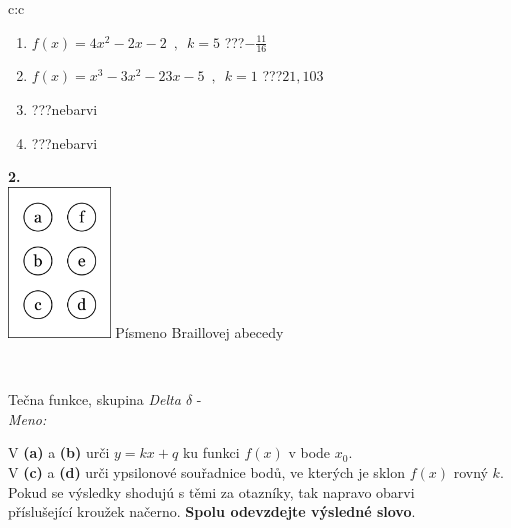 \documentclass[10pt]{report}
\begin{document}
\begin{tabular}{c:c}
\begin{minipage}[c][104.5mm][t]{0.5\linewidth}
\begin{center}
\begin{minipage}{0.79\linewidth}
\begin{center}
\begin{varwidth}{\linewidth}
\begin{enumerate}
\item $f(x)=4x^2-2x-2\enspace , \enspace k=5$\quad \dotfill\; ???\;\dotfill \quad $-\frac{11}{16}$
\item $f(x)=x^3-3x^2-23x-5\enspace , \enspace k=1$\quad \dotfill\; ???\;\dotfill \quad $21 , 103$
\item \quad \dotfill\; ???\;\dotfill \quad nebarvi
\item \quad \dotfill\; ???\;\dotfill \quad nebarvi
\end{enumerate}
\end{varwidth}
\end{center}
\end{minipage}
\begin{minipage}{0.20\linewidth}
\begin{center}
{\Huge\bfseries 2.} \\[2mm]
\includegraphics[height=40mm]{../images/braille.png}
{\small Písmeno Braillovej abecedy}
\end{center}
\end{minipage}
\end{center}
\end{minipage}
\\ \hdashline
\begin{minipage}[c][104.5mm][t]{0.5\linewidth}
\begin{center}
\vspace{7mm}
{\huge Tečna funkce, skupina \textit{Delta $\delta$} -}\\[5mm]
\textit{Meno:}\phantom{xxxxxxxxxxxxxxxxxxxxxxxxxxxxxxxxxxxxxxxxxxxxxxxxxxxxxxxxxxxxxxxxx}\\[5mm]
\begin{minipage}{0.95\linewidth}
\begin{center}
V \textbf{(a)} a \textbf{(b)} urči  $y = kx + q$ ku funkci $f(x)$ v bode $x_0$.\\V \textbf{(c)} a \textbf{(d)} urči ypsilonové souřadnice bodů, ve kterých je sklon $f(x)$ rovný $k$.\\Pokud se výsledky shodujú s těmi za otazníky, tak napravo obarvi\\příslušející kroužek načerno. \textbf{Spolu odevzdejte výsledné slovo}.

\end{center}
\end{minipage}
\end{center}
\end{minipage}
\end{tabular}
\end{document}
